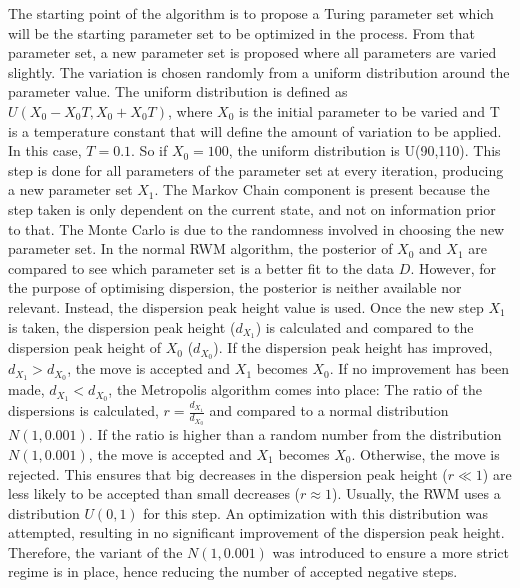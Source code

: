 The starting point of the algorithm is to propose a Turing parameter set which will be the starting parameter set to be optimized in the process.
From that parameter set, a new parameter set is proposed where all parameters are varied slightly.
The variation is chosen randomly from a uniform distribution around the parameter value.
The uniform distribution is defined as $U(X_{0} - X_{0}T, X_{0} + X_{0}T)$, where $X_{0}$ is the initial parameter to be varied and T is a temperature constant that will define the amount of variation to be applied.
In this case, $T=0.1$.
So if $X_{0}=100$, the uniform distribution is U(90,110).
This step is done for all parameters of the parameter set at every iteration, producing a new parameter set $X_{1}$.
The Markov Chain component is present because the step taken is only dependent on the current state, and not on information prior to that.
The Monte Carlo is due to the randomness involved in choosing the new parameter set.
In the normal RWM algorithm, the posterior of $X_{0}$ and $X_{1}$ are compared to see which parameter set is a better fit to the data $D$.
However, for the purpose of optimising dispersion, the posterior is neither available nor relevant.
Instead, the dispersion peak height value is used.
Once the new step $X_{1}$ is taken, the dispersion peak height ($d_{X_{1}}$) is calculated and compared to the dispersion peak height of $X_{0}$ ($d_{X_{0}}$). If the dispersion peak height has improved, $d_{X_{1}} > d_{X_{0}}$, the move is accepted and $X_{1}$ becomes $X_{0}$.
If no improvement has been made, $d_{X_{1}} < d_{X_{0}}$, the Metropolis algorithm comes into place: The ratio of the dispersions is calculated, $r = \frac{d_{X_{1}}}{d_{X_{0}}}$ and compared to a normal distribution $N(1,0.001)$.
If the ratio is higher than a random number from the distribution $N(1,0.001)$, the move is accepted and $X_{1}$ becomes $X_{0}$.
Otherwise, the move is rejected.
This ensures that big decreases in the dispersion peak height ($r \ll 1$) are less likely to be accepted than small decreases ($r \approx 1$).
Usually, the RWM uses a distribution $U(0,1)$ for this step.
An optimization with this distribution was attempted, resulting in no significant improvement of the dispersion peak height.
Therefore, the variant of the $N(1,0.001) $ was introduced to ensure a more strict regime is in place, hence reducing the number of accepted negative steps.


